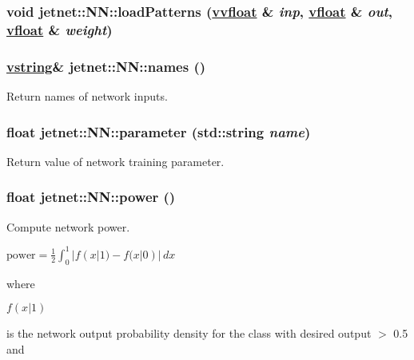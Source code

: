 \hypertarget{classjetnet_1_1NN_a16}{
\subsubsection[loadPatterns]{\setlength{\rightskip}{0pt plus 5cm}void jetnet::NN::load\-Patterns (\hyperlink{jetnet_8hpp_a4}{vvfloat} \& {\em inp}, \hyperlink{jetnet_8hpp_a0}{vfloat} \& {\em out}, \hyperlink{jetnet_8hpp_a0}{vfloat} \& {\em weight})}}
\label{classjetnet_1_1NN_a16}


\hypertarget{classjetnet_1_1NN_a18}{
\subsubsection[names]{\setlength{\rightskip}{0pt plus 5cm}\hyperlink{jetnet_8hpp_a3}{vstring}\& jetnet::NN::names ()}}
\label{classjetnet_1_1NN_a18}


Return names of network inputs. 

\hypertarget{classjetnet_1_1NN_a17}{
\subsubsection[parameter]{\setlength{\rightskip}{0pt plus 5cm}float jetnet::NN::parameter (std::string {\em name})}}
\label{classjetnet_1_1NN_a17}


Return value of network training parameter. 

\hypertarget{classjetnet_1_1NN_a25}{
\subsubsection[power]{\setlength{\rightskip}{0pt plus 5cm}float jetnet::NN::power ()}}
\label{classjetnet_1_1NN_a25}


Compute network power. 

$\mbox{power} = \frac{1}{2}\int_0^1 |f(x|1) - f(x|0)| \, dx$

where

$f(x|1)$

is the network output probability density for the class with desired output $>$ 0.5 and

